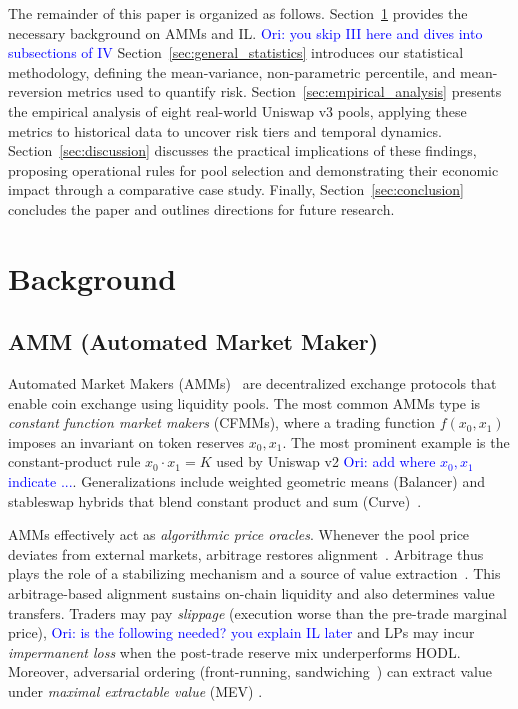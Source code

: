 \documentclass[journal]{IEEEtran}
\newcommand{\ori}[1]{\textcolor{blue}{Ori: #1}}
\begin{document}
The remainder of this paper is organized as follows. Section~\ref{sec:background} provides the necessary background on AMMs and IL. \ori{you skip III here and dives into subsections of IV} Section~\ref{sec:general_statistics} introduces our statistical methodology, defining the mean-variance, non-parametric percentile, and mean-reversion metrics used to quantify risk. Section~\ref{sec:empirical_analysis} presents the empirical analysis of eight real-world Uniswap v3 pools, applying these metrics to historical data to uncover risk tiers and temporal dynamics. Section~\ref{sec:discussion} discusses the practical implications of these findings, proposing operational rules for pool selection and demonstrating their economic impact through a comparative case study. Finally, Section~\ref{sec:conclusion} concludes the paper and outlines directions for future research.


\section{Background}
\label{sec:background}
\subsection{AMM (Automated Market Maker)}
Automated Market Makers (AMMs)~\cite{hertzog2017bancor} are decentralized exchange protocols that enable coin exchange using liquidity pools. 
The most common AMMs type is \emph{constant function market makers} (CFMMs), where a trading function $f(x_0,x_1)$ imposes an invariant on token reserves $x_0, x_1$.
The most prominent example is the constant-product rule $x_0 \cdot x_1 = K$ used by Uniswap v2 \ori{add where $x_0, x_1$ indicate ...}. Generalizations include weighted geometric means (Balancer) and stableswap hybrids that blend constant product and sum (Curve)~\cite{bartoletti2022theory}.


AMMs effectively act as \emph{algorithmic price oracles}. Whenever the pool price deviates from external markets, arbitrage restores alignment~\cite{angeris2020improved}. 
Arbitrage thus plays the role of a stabilizing mechanism and a source of value extraction~\cite{pusceddu2024lean}.
This arbitrage-based alignment sustains on-chain liquidity and also determines value transfers. Traders may pay \emph{slippage} (execution worse than the pre-trade marginal price), \ori{is the following needed? you explain IL later} and LPs may incur \emph{impermanent loss} when the post-trade reserve mix underperforms HODL. Moreover, adversarial ordering (front-running, sandwiching~\cite{heimbach2022eliminating, zhou2021high}) can extract value under \emph{maximal extractable value} (MEV) \cite{mazorra2022price, daian2020flash, qin2021mev}.
\end{document}
